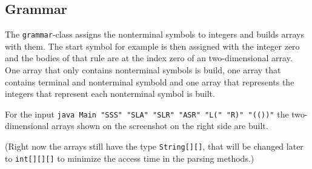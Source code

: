 \documentclass[a4paper, 11pt]{article}
\newcommand{\dq}{"}
\begin{document}

\subsection{Grammar}
\label{grammar}



\begin{minipage}{0.6\textwidth}
\vspace*{-2em}

The \texttt{grammar}-class assigns the nonterminal symbols to integers and builds arrays with them. The start symbol for example is then assigned with the integer zero and the bodies of that rule are at the index zero of an two-dimensional array. One array that only contains nonterminal symbols is build, one array that contains terminal and nonterminal symbold and one array that represents the integers that represent each nonterminal symbol is built.

For the input \texttt{java Main \dq SSS\dq \ \dq SLA\dq \ \dq SLR\dq \ \dq ASR\dq \ \dq L(\dq \ \dq R)\dq\  \dq (())\dq} the two-dimensional arrays shown on the screenshot on the right side are built.

(Right now the arrays still have the type \texttt{String[][]}, that will be changed later to \texttt{int[][][]} to minimize the access time in the parsing methods.)



\end{minipage}
\end{document}
